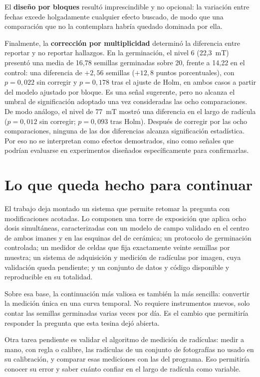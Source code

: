 El \textbf{diseño por bloques} resultó imprescindible y no opcional: la variación entre fechas excede holgadamente cualquier efecto buscado, de modo que una comparación que no la contemplara habría quedado dominada por ella.

Finalmente, la \textbf{corrección por multiplicidad} determinó la diferencia entre reportar y no reportar hallazgos. En la germinación, el nivel 6 (22{,}3~mT) presentó una media de 16{,}78 semillas germinadas sobre 20, frente a 14{,}22 en el control: una diferencia de \(+2{,}56\) semillas (\(+12{,}8\) puntos porcentuales), con \(p = 0{,}022\) sin corregir y \(p = 0{,}178\) tras el ajuste de Holm, en ambos casos a partir del modelo ajustado por bloque. Es una señal sugerente, pero no alcanza el umbral de significación adoptado una vez consideradas las ocho comparaciones. De modo análogo, el nivel de 77~mT mostró una diferencia en el largo de radícula (\(p = 0{,}012\) sin corregir; \(p = 0{,}093\) tras Holm). Después de corregir por las ocho comparaciones, ninguna de las dos diferencias alcanza significación estadística. Por eso no se interpretan como efectos demostrados, sino como señales que podrían evaluarse en experimentos diseñados específicamente para confirmarlas.

\section*{Lo que queda hecho para continuar}

El trabajo deja montado un sistema que permite retomar la pregunta con modificaciones acotadas. Lo componen una torre de exposición que aplica ocho dosis simultáneas, caracterizadas con un modelo de campo validado en el centro de ambos imanes y en las esquinas del de cerámica; un protocolo de germinación controlada; un medidor de celdas que fija exactamente veinte semillas por muestra; un sistema de adquisición y medición de radículas por imagen, cuya validación queda pendiente; y un conjunto de datos y código disponible y reproducible en su totalidad.

Sobre esa base, la continuación más valiosa es también la más sencilla: convertir la medición única en una curva temporal. No requiere instrumentos nuevos, solo contar las semillas germinadas varias veces por día. Es el cambio que permitiría responder la pregunta que esta tesina dejó abierta.

Otra tarea pendiente es validar el algoritmo de medición de radículas: medir a mano, con regla o calibre, las radículas de un conjunto de fotografías no usado en su calibración, y comparar esas mediciones con las del programa. Eso permitiría conocer su error y saber cuánto confiar en el largo de radícula como variable.

\endinput
